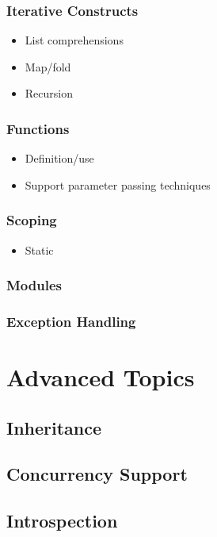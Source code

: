 \documentclass[titlepage,12pt]{article}
\newcommand{\bi}{\begin{itemize}}
\newcommand{\ei}{\end{itemize}}
\begin{document}
\subsubsection{Iterative Constructs}
\bi
    \item List comprehensions
    \item Map/fold
    \item Recursion
\ei

\subsubsection{Functions}
\bi
    \item Definition/use
    \item Support parameter passing techniques
\ei

\subsubsection{Scoping}
\bi
    \item Static
\ei

\subsubsection{Modules}

\subsubsection{Exception Handling}


\section{Advanced Topics}

\subsection{Inheritance}
\subsection{Concurrency Support}
\subsection{Introspection}



\end{document}
